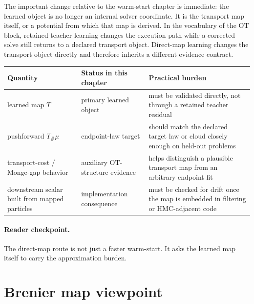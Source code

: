 The important change relative to the warm-start chapter is immediate: the learned
object is no longer an internal solver coordinate.  It is the transport map
itself, or a potential from which that map is derived.  In the vocabulary of the
OT block, retained-teacher learning changes the execution path while a corrected
solve still returns to a declared transport object.  Direct-map learning changes
the transport object directly and therefore inherits a different evidence
contract.

\begin{center}
\small
\begin{tabular}{p{} p{} p{}}
\toprule
Quantity & Status in this chapter & Practical burden \\
\midrule
learned map \(T\) & primary learned object & must be validated directly, not through a retained teacher residual \\
pushforward \(T_\#\mu\) & endpoint-law target & should match the declared target law or cloud closely enough on held-out problems \\
transport-cost / Monge-gap behavior & auxiliary OT-structure evidence & helps distinguish a plausible transport map from an arbitrary endpoint fit \\
downstream scalar built from mapped particles & implementation consequence & must be checked for drift once the map is embedded in filtering or HMC-adjacent code \\
\bottomrule
\end{tabular}
\end{center}

\paragraph{Reader checkpoint.}
The direct-map route is not just a faster warm-start.  It asks the learned map
itself to carry the approximation burden.

\section{Brenier map viewpoint}
\label{sec:bf-neural-ot-direct-brenier}

